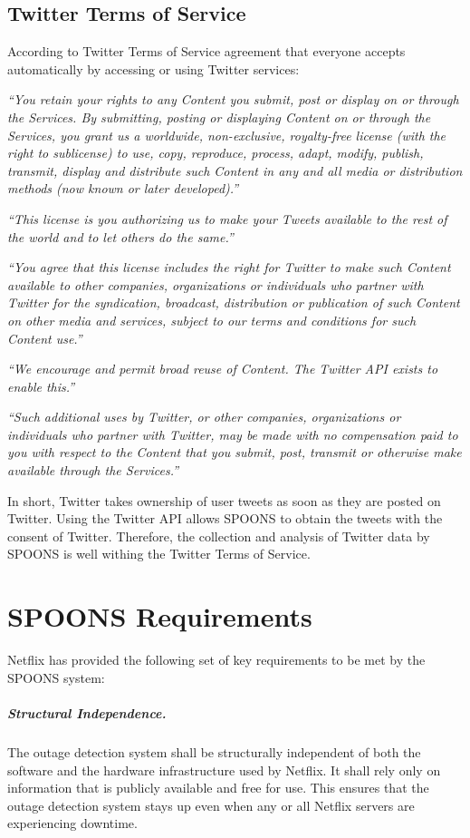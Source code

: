 \documentclass[12pt]{ucthesis}
\begin{document}
\section{Twitter Terms of Service}

According to Twitter Terms of Service\cite{termsOfService} agreement that
everyone accepts automatically by accessing or using Twitter services:

\emph{``You retain your rights to any Content you submit, post or
display on or through the Services. By submitting, posting or displaying Content
on or through the Services, you grant us a worldwide, non-exclusive,
royalty-free license (with the right to sublicense) to use, copy, reproduce,
process, adapt, modify, publish, transmit, display and distribute such Content
in any and all media or distribution methods (now known or later developed).''}

\emph{``This license is you authorizing us to make your Tweets available to the
rest of the world and to let others do the same.''}

\emph{``You agree that this license includes the right for Twitter to make such
Content available to other companies, organizations or individuals who partner with
Twitter for the syndication, broadcast, distribution or publication of such
Content on other media and services, subject to our terms and conditions for
such Content use.''}

\emph{``We encourage and permit broad reuse of Content. The Twitter API exists to
enable this.''}

\emph{``Such additional uses by Twitter, or other companies, organizations or
individuals who partner with Twitter, may be made with no compensation paid to
you with respect to the Content that you submit, post, transmit or otherwise
make available through the Services.''}

In short, Twitter takes ownership of user tweets as soon as they are posted on Twitter.
Using the Twitter API allows SPOONS to obtain the tweets with the consent of Twitter.
Therefore, the collection and analysis of Twitter data by SPOONS is well withing the
Twitter Terms of Service.

\chapter{SPOONS Requirements}
Netflix has provided the following set of key requirements to be met by the
SPOONS system:

\paragraph{Structural Independence.}
The outage detection system shall be structurally independent of both the
software and the hardware infrastructure used by Netflix. It shall rely only on
information that is publicly available and free for use. This ensures that the
outage detection system stays up even when any or all Netflix servers are
experiencing downtime.
\end{document}
